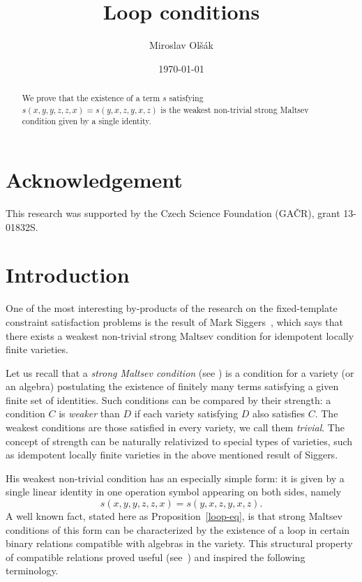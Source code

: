 \documentclass[a4paper]{article}
\title{Loop conditions}
\author{Miroslav Ol\v s\'ak}
\date{\today}
\begin{document}
\maketitle

\begin{abstract}
We prove that the existence of a term $s$ satisfying $s(x,y,y,z,z,x)=s(y,x,z,y,x,z)$ is the weakest non-trivial strong Maltsev condition given by a single identity. 
\end{abstract}

\section*{Acknowledgement}

This research was supported by the Czech Science Foundation (GAČR), grant 13-01832S.

\section{Introduction}

One of the most interesting by-products of the research on the fixed-template constraint satisfaction problems is the result of Mark Siggers~\cite{Siggers}, which says that there exists a weakest non-trivial strong Maltsev condition for idempotent locally finite varieties.

Let us recall that a \emph{strong Maltsev condition} (see \cite{BS,MMT,Bergman}) is a condition for a variety (or an algebra) postulating the existence of finitely many terms satisfying a given finite set of identities. Such conditions can be compared by their strength: a condition $C$ is \emph{weaker} than $D$ if each variety satisfying $D$ also satisfies $C$. The weakest conditions are those satisfied in every variety, we call them \emph{trivial}. The concept of strength can be naturally relativized to special types of varieties, such as idempotent locally finite varieties in the above mentioned result of Siggers.

His weakest non-trivial condition  has an especially simple form: it is given by a single linear identity in one operation symbol appearing on both sides, namely 
$$s(x,y,y,z,z,x)=s(y,x,z,y,x,z). $$
A well known fact, stated here as Proposition~\ref{loop-eq}, is that
strong Maltsev conditions of this form can be characterized by the existence of a loop
in certain binary relations compatible with algebras in the variety. 
This structural property of compatible relations proved useful (see~\cite{Cyclic,AbsSurvey}) and inspired the following terminology.
\end{document}
